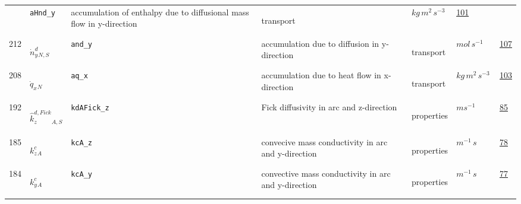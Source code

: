 \begin{longtable}{|p{1cm}|p{2.5cm}|p{4.5cm}|p{8cm}|p{3.0cm}|p{3cm}|p{1cm}|}
             & \verb|aHnd_y|
             & accumulation of enthalpy due to diffusional mass flow in y-direction
             & \begin{lay}transport \end{lay}
             & $ kg \,m^{2} \,s^{-3} \, $
             &                 \hyperlink{"e:101"}{ 101 }
                 \\
            212
             & \hypertarget{"v:212"}{ $ {{\dot{n}^d_y}}{_{N, S}} $}
             & \verb|and_y|
             & accumulation due to diffusion in y-direction
             & \begin{lay}transport \end{lay}
             & $ mol \,s^{-1} \, $
             &                 \hyperlink{"e:107"}{ 107 }
                 \\
            208
             & \hypertarget{"v:208"}{ $ {{\dot{q}_x}}{_{N}} $}
             & \verb|aq_x|
             & accumulation due to heat flow in x-direction
             & \begin{lay}transport \end{lay}
             & $ kg \,m^{2} \,s^{-3} \, $
             &                 \hyperlink{"e:103"}{ 103 }
                 \\
            192
             & \hypertarget{"v:192"}{ $ {{\hat{k}^{d,Fick}_z}}{_{A, S}} $}
             & \verb|kdAFick_z|
             & Fick diffusivity in arc and z-direction
             & \begin{lay}properties \end{lay}
             & $ m s^{-1} \, $
             &                 \hyperlink{"e:85"}{ 85 }
                 \\
            185
             & \hypertarget{"v:185"}{ $ {{k^c_z}}{_{A}} $}
             & \verb|kcA_z|
             & convecive mass conductivity in arc and y-direction
             & \begin{lay}properties \end{lay}
             & $ m^{-1} \,s \, $
             &                 \hyperlink{"e:78"}{ 78 }
                 \\
            184
             & \hypertarget{"v:184"}{ $ {{k^c_y}}{_{A}} $}
             & \verb|kcA_y|
             & convective mass conductivity in arc and y-direction
             & \begin{lay}properties \end{lay}
             & $ m^{-1} \,s \, $
             &                 \hyperlink{"e:77"}{ 77 }
                 \\

\end{longtable}
